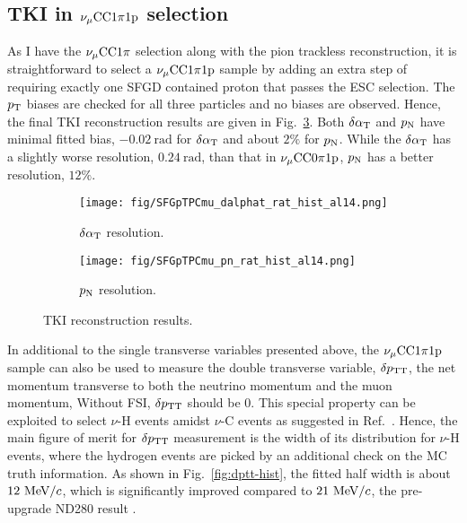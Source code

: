     \subsection{\label{sec:1pi-tki} TKI in $\nu_{\mu}\textrm{CC}1\pi1\textrm{p}$ selection}

    As I have the $\nu_{\mu}\textrm{CC}1\pi$ selection along with the pion trackless reconstruction, it is straightforward to select a $\nu_{\mu}\textrm{CC}1\pi1\textrm{p}$ sample by adding an extra step of requiring exactly one SFGD contained proton that passes the ESC selection. 
    The $p_\textrm{T}$ biases are checked for all three particles and no biases are observed. Hence, the final TKI reconstruction results are given in Fig.~\ref{fig:1pi-tki-res}. Both $\delta\alpha_\textrm{T}$ and $p_\textrm{N}$ have minimal fitted bias, $-0.02~\textrm{rad}$ for $\delta\alpha_\textrm{T}$ and about $2\%$ for $p_\textrm{N}$. While the $\delta\alpha_\textrm{T}$ has a slightly worse resolution, $0.24~\textrm{rad}$, than that in $\nu_{\mu}\textrm{CC}0\pi1\textrm{p}$, $p_\textrm{N}$ has a better resolution, $12\%$. 
    
   \begin{figure}[!htb] 
       \centering
       \begin{subfigure}{0.45\textwidth}
            \texttt{[image: fig/SFGpTPCmu\_dalphat\_rat\_hist\_al14.png]}
            \caption{$\delta\alpha_\textrm{T}$ resolution.}
            \label{fig:1pi-dat-res}
       \end{subfigure}
       \begin{subfigure}{0.45\textwidth}
            \texttt{[image: fig/SFGpTPCmu\_pn\_rat\_hist\_al14.png]}
            \caption{$p_\textrm{N}$ resolution.}
            \label{fig:1pi-pn-res}
       \end{subfigure}
       \caption{TKI reconstruction results.}
       \label{fig:1pi-tki-res}
    \end{figure}

    In additional to the single transverse variables presented above, the $\nu_{\mu}\textrm{CC}1\pi1\textrm{p}$ sample can also be used to measure the double transverse variable, $\delta p_\textrm{TT}$, the net momentum transverse to both the neutrino momentum and the muon momentum,
    Without FSI, $\delta p_\textrm{TT}$ should be $0$. This special property can be exploited to select $\nu$-H events amidst $\nu$-C events as suggested in Ref.~\cite{dpttpaper}. 
    Hence, the main figure of merit for $\delta p_\textrm{TT}$ measurement is the width of its distribution for $\nu$-H events, where the hydrogen events are picked by an additional check on the MC truth information.
    As shown in Fig.~\ref{fig:dptt-hist}, the fitted half width is about $12~\textrm{MeV}/c$, which is significantly improved compared to $21~\textrm{MeV}/c$, the pre-upgrade ND280 result \cite{dpttpaper}.

